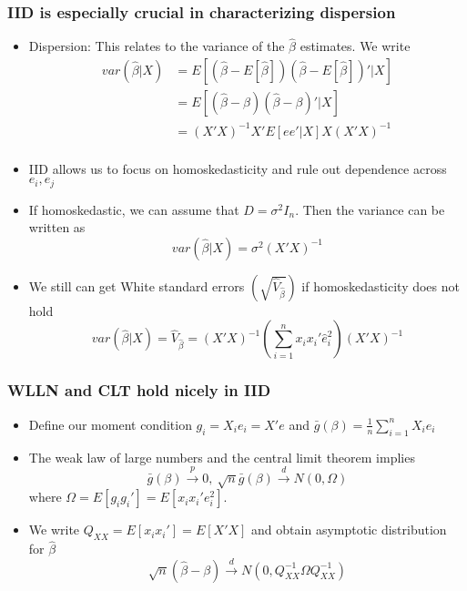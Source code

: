 \documentclass[aspectratio=169]{beamer}
\begin{document}
\begin{frame}
\frametitle{IID is especially crucial in characterizing dispersion}
\begin{itemize}
\item  Dispersion: This relates to the variance of the $\hat{\beta}$ estimates. We write
\[
\begin{aligned}
var(\hat{\beta}|X)&=E[(\hat{\beta}-E[\hat{\beta}])(\hat{\beta}-E[\hat{\beta}])'|X]\\
&=E[(\hat{\beta}-\beta)(\hat{\beta}-\beta)'|X]\\
&=(X'X)^{-1}X'E[ee'|X]X(X'X)^{-1}\\
\end{aligned}
\]
\item IID allows us to focus on homoskedasticity and rule out dependence across $e_i, e_j$
\item If homoskedastic, we can assume that $D=\sigma^2 I_n$. Then the variance can be written as
\[
var(\hat{\beta}|X)=\sigma^2(X'X)^{-1}
\]
\item We still can get White standard errors $\left(\sqrt{\widehat{V}_{\hat{\beta}}}\right)$ if homoskedasticity does not hold
\[
var(\hat{\beta}|X)=\widehat{V}_{\hat{\beta}}=(X'X)^{-1}\left(\sum_{i=1}^n x_ix_i'\hat{e}_i^2\right)(X'X)^{-1}
\]
\end{itemize}
\end{frame}

\begin{frame}
\frametitle{WLLN and CLT hold nicely in IID}
\begin{itemize}
\item Define our moment condition $g_i = X_ie_i = X'e$ and $\bar{g}(\beta)=\frac{1}{n}\sum_{i=1}^n X_ie_i$
\item The weak law of large numbers and the central limit theorem implies
\[
\bar{g}(\beta)\xrightarrow{p} 0,  \ \sqrt{n}\bar{g}(\beta)\xrightarrow{d}N(0,\Omega)
\]
where $\Omega=E[g_ig_i']=E[x_ix_i'e_i^2]$. 
\item We write $Q_{XX}=E[x_ix_i']=E[X'X]$ and obtain asymptotic distribution for $\hat{\beta}$
\[
\sqrt{n}(\hat{\beta}-\beta)\xrightarrow{d}N(0,Q_{XX}^{-1}\Omega Q_{XX}^{-1})
\]
\end{itemize}
\end{frame}
\end{document}
